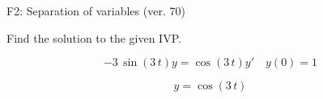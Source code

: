 \begin{exercise}
  \begin{exerciseTitle}F2: Separation of variables (ver. 70)\end{exerciseTitle}
  \begin{exerciseStatement}
    
Find the solution to the given IVP.

    
\[-3 \, \sin\left(3 \, t\right) y= \cos\left(3 \, t\right) y'\hspace{1em} y\left( 0 \right)= 1\]

  \end{exerciseStatement}
  \begin{exerciseAnswer}
    
\[y= \cos\left(3 \, t\right)\]

  \end{exerciseAnswer}
\end{exercise}